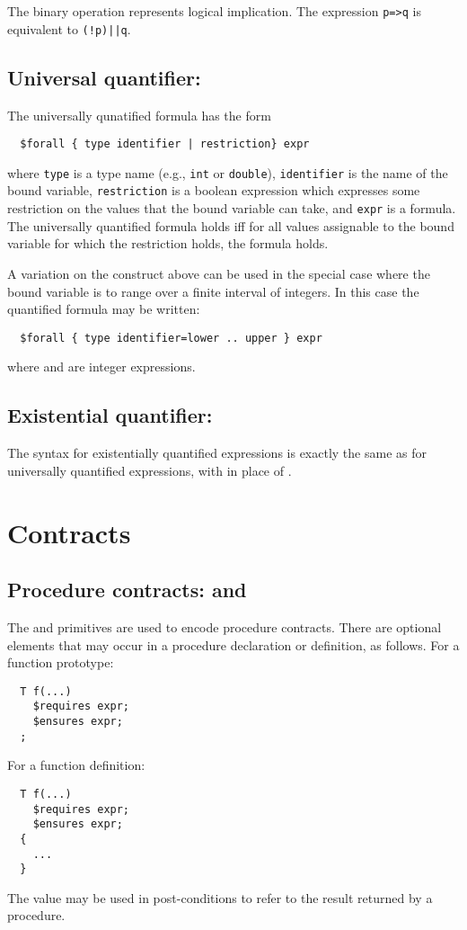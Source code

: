 The binary operation \cimplies{} represents logical implication.
The expression \verb!p=>q! is equivalent to \verb~(!p)||q~.

\subsection{Universal quantifier: \cforall}

The universally qunatified formula has the form
\begin{verbatim}
  $forall { type identifier | restriction} expr
\end{verbatim}
where \verb!type! is a type name (e.g., \texttt{int} or
\texttt{double}), \verb!identifier! is the name of the bound variable,
\verb!restriction! is a boolean expression which expresses some
restriction on the values that the bound variable can take, and
\verb!expr! is a formula.  The universally quantified formula
holds iff for all values assignable to the bound variable
for which the restriction holds, the formula  holds.

A variation on the construct above can be used in the special case
where the bound variable is to range over a finite interval
of integers.  In this case the quantified formula may be written:
\begin{verbatim}
  $forall { type identifier=lower .. upper } expr
\end{verbatim}
where  and  are integer expressions.

\subsection{Existential quantifier: \cexists}

The syntax for existentially quantified expressions is exactly the
same as for universally quantified expressions, with \cexists{} in
place of \cforall{}.

\section{Contracts}

\subsection{Procedure contracts: \crequires{} and \censures{}}
The \crequires{} and \censures{} primitives are used to encode
procedure contracts.  There are optional
elements that may occur in a procedure declaration or definition,
as follows.  For a function prototype:
\begin{verbatim}
  T f(...)
    $requires expr;
    $ensures expr;
  ;
\end{verbatim}
For a function definition:
\begin{verbatim}
  T f(...)
    $requires expr;
    $ensures expr;
  {
    ...
  }
\end{verbatim}
The value \cresult{} may be used in post-conditions to refer
to the result returned by a procedure.

